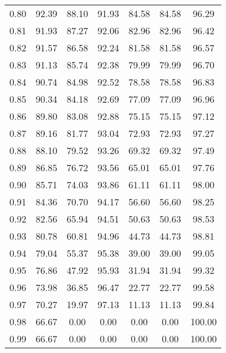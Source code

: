 \begin{tabular}{|c|c|c|c|c|c|c|}
      0.80 &     92.39 &     88.10 &      91.93 &   84.58 &      84.58 &         96.29 \\
      0.81 &     91.93 &     87.27 &      92.06 &   82.96 &      82.96 &         96.42 \\
      0.82 &     91.57 &     86.58 &      92.24 &   81.58 &      81.58 &         96.57 \\
      0.83 &     91.13 &     85.74 &      92.38 &   79.99 &      79.99 &         96.70 \\
      0.84 &     90.74 &     84.98 &      92.52 &   78.58 &      78.58 &         96.83 \\
      0.85 &     90.34 &     84.18 &      92.69 &   77.09 &      77.09 &         96.96 \\
      0.86 &     89.80 &     83.08 &      92.88 &   75.15 &      75.15 &         97.12 \\
      0.87 &     89.16 &     81.77 &      93.04 &   72.93 &      72.93 &         97.27 \\
      0.88 &     88.10 &     79.52 &      93.26 &   69.32 &      69.32 &         97.49 \\
      0.89 &     86.85 &     76.72 &      93.56 &   65.01 &      65.01 &         97.76 \\
      0.90 &     85.71 &     74.03 &      93.86 &   61.11 &      61.11 &         98.00 \\
      0.91 &     84.36 &     70.70 &      94.17 &   56.60 &      56.60 &         98.25 \\
      0.92 &     82.56 &     65.94 &      94.51 &   50.63 &      50.63 &         98.53 \\
      0.93 &     80.78 &     60.81 &      94.96 &   44.73 &      44.73 &         98.81 \\
      0.94 &     79.04 &     55.37 &      95.38 &   39.00 &      39.00 &         99.05 \\
      0.95 &     76.86 &     47.92 &      95.93 &   31.94 &      31.94 &         99.32 \\
      0.96 &     73.98 &     36.85 &      96.47 &   22.77 &      22.77 &         99.58 \\
      0.97 &     70.27 &     19.97 &      97.13 &   11.13 &      11.13 &         99.84 \\
      0.98 &     66.67 &      0.00 &       0.00 &    0.00 &       0.00 &        100.00 \\
      0.99 &     66.67 &      0.00 &       0.00 &    0.00 &       0.00 &        100.00 \\
\bottomrule
\end{tabular}
